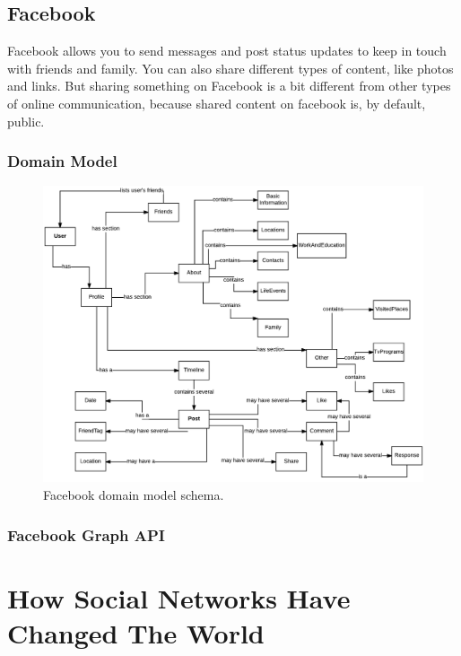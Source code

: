 \subsection{Facebook}

Facebook allows you to send messages and post status updates to keep in touch with friends and family. You can also share different types
of content, like photos and links. But sharing something on Facebook is a bit different from other types of online communication, because shared content
on facebook is, by default, public.

\subsubsection*{Domain Model}

\begin{figure}[h!]
  \hspace*{-1in}
  \includegraphics[width=1.2\textwidth]{img/facebook-domain-model.png}
\caption{\label{img:fbdomain} Facebook domain model schema.}
\end{figure}

\indent

\subsubsection*{Facebook Graph API}


\section{How Social Networks Have Changed The World}
